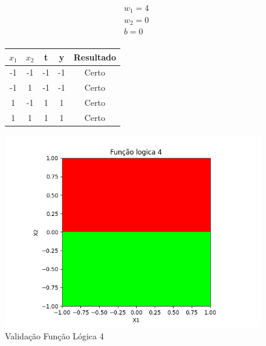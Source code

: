 \begin{figure}[h!]
\centering
\begin{minipage}[c]{0.49\linewidth}
\centering
\[
\begin{aligned}
&w_1 = 4\\
&w_2 = 0\\
&b = 0\\
\end{aligned}
\]
\begin{tabular}{|c|c|c|c|c|}\hline
$x_1$ & $x_2$ & t & y & Resultado\\ \hline
 -1 & -1 & -1 & -1 & Certo\\ \hline
 -1 & 1 & -1 & -1 & Certo\\ \hline
 1 & -1 & 1 & 1 & Certo\\ \hline
 1 & 1 & 1 & 1 & Certo\\ \hline
\end{tabular}
\end{minipage}
\hfill
\begin{minipage}[c]{0.5\linewidth}
\centering
\singlespacing
\includegraphics[width=1.2\textwidth]{im/im4}
\end{minipage}
\caption{Validação Função Lógica 4}
\label{vl4}
\end{figure}


